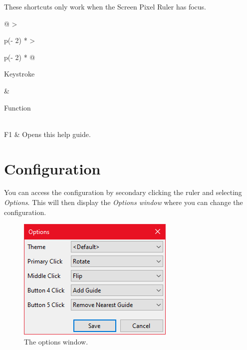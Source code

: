 \documentclass[
]{book}
\begin{document}
These shortcuts only work when the Screen Pixel Ruler has focus.

\begin{longtable}[]{@{}
  >{\raggedright\arraybackslash}p{(\columnwidth - 2\tabcolsep) * }
  >{\raggedright\arraybackslash}p{(\columnwidth - 2\tabcolsep) * }@{}}
\toprule\noalign{}
\begin{minipage}[b]{\linewidth}\raggedright
Keystroke
\end{minipage} & \begin{minipage}[b]{\linewidth}\raggedright
Function
\end{minipage} \\
\midrule\noalign{}
\endhead
\bottomrule\noalign{}
\endlastfoot
F1 & Opens this help guide. \\
\end{longtable}

\chapter{Configuration}\label{config}

You can access the configuration by secondary clicking the ruler and selecting \emph{Options}.
This will then display the \emph{Options window} where you can change the configuration.

\begin{figure}
\includegraphics[width=1\linewidth]{images/options} \caption{The options window.}\label{fig:unnamed-chunk-4}
\end{figure}
\end{document}
